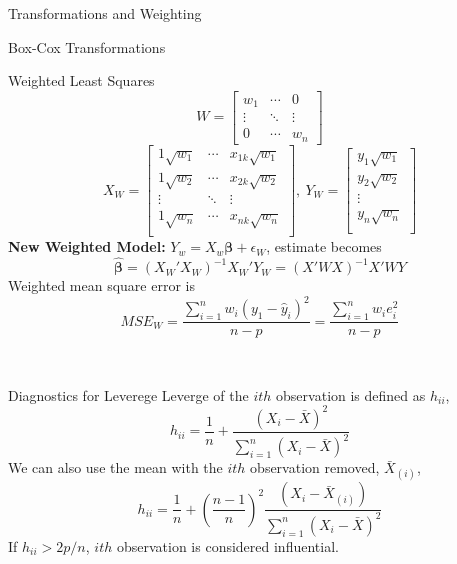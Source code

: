 \documentclass{article}
\begin{document}
\begin{multicols*}{3}
\begin{blackbox}{Transformations and Weighting}
\begin{bluebox}{Box-Cox Transformations}
    \end{bluebox}
    \renewcommand{\arraystretch}{0.75}
    \begin{pinkbox}{Weighted Least Squares}
        \[W = \begin{bmatrix}
            w_1 & \cdots & 0 \\
            \vdots & \ddots  & \vdots\\
            0  & \cdots & w_n
        \end{bmatrix}\]
        \[X_W = \begin{bmatrix}
            1\sqrt{w_1} & \cdots & x_{1k}\sqrt{w_1}\\
            1\sqrt{w_2} & \cdots & x_{2k}\sqrt{w_2}\\
            \vdots  & \ddots & \vdots\\
            1\sqrt{w_n}  & \cdots & x_{nk}\sqrt{w_n}\\
        \end{bmatrix}, \ Y_W = \begin{bmatrix}
            y_1\sqrt{w_1}\\
            y_2\sqrt{w_2}\\
            \vdots\\
            y_n\sqrt{w_n}\\
        \end{bmatrix}\]
        \textbf{New Weighted Model:} $Y_w = X_w\boldsymbol{\beta} + \epsilon_W$, estimate becomes\\[-2ex] 
        \[\boldsymbol{\hat{\beta}} = (X_W'X_W)^{-1}X_W'Y_W = (X'WX)^{-1}X'WY\]
        Weighted mean square error is\\[-2ex]
        \[MSE_W = \frac{\sum_{i=1}^n w_i(y_1 - \hat{y}_i)^2}{n-p} = \frac{\sum_{i=1}^nw_ie_i^2}{n-p}\]
    \end{pinkbox}\\[-2ex]
    \end{blackbox}
    \begin{blackbox}{Diagnostics for Leverege}
        Leverge of the $ith$ observation is defined as $h_{ii}$,\\[-1ex] 
        \[h_{ii} = \frac{1}{n} + \frac{(X_i-\bar{X})^2}{\sum_{i=1}^n (X_i-\bar{X})^2}\]
        We can also use the mean with the $ith$ observation removed, $\bar{X}_{(i)}$,\\[-3ex]
        \[h_{ii} = \frac{1}{n} + \left(\frac{n-1}{n}\right)^2\frac{(X_i-\bar{X}_{(i)})}{\sum_{i=1}^n(X_i-\bar{X})^2}\]
        If $h_{ii} > 2p/n$, $ith$ observation is considered influential.
    \end{blackbox}

\end{multicols*}
\end{document}
